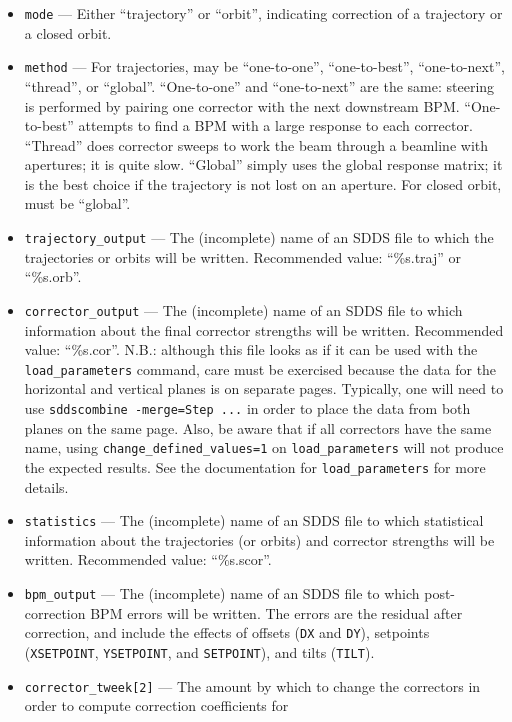 \documentclass[11pt]{article}
\begin{document}
\begin{itemize}

\item \verb|mode| --- Either ``trajectory'' or ``orbit'', indicating
correction of a trajectory or a closed orbit.
\item \verb|method| --- For trajectories, may be ``one-to-one'', ``one-to-best'', ``one-to-next'', ``thread'', or ``global''.  
``One-to-one'' and ``one-to-next'' are the same: steering is performed by pairing one corrector with the next downstream BPM.
``One-to-best'' attempts to find a BPM with a large response to each corrector.  ``Thread'' does corrector sweeps to work the
beam through a beamline with apertures; it is quite slow.  ``Global'' simply uses the global response matrix; it is the best
choice if the trajectory is not lost on an aperture.
For closed orbit, must be ``global''.
\item \verb|trajectory_output| --- The (incomplete) name of an SDDS file to which the trajectories or orbits will be written.  Recommended value: ``\%s.traj'' or ``\%s.orb''.  
\item \verb|corrector_output| --- The (incomplete) name of an SDDS file to which information about the final corrector strengths will be written. Recommended value: ``\%s.cor''.  N.B.: although this file looks as if it can be used with the \verb|load_parameters| command, care must be exercised because the data for the
horizontal and vertical planes is on separate pages. Typically, one will need to use \verb|sddscombine -merge=Step ...| in order to place the data from both planes on the same page. Also, be aware that if all correctors have the same name, using \verb|change_defined_values=1| on \verb|load_parameters| will not produce the expected results. See the documentation for \verb|load_parameters| for more details.
\item \verb|statistics| --- The (incomplete) name of an SDDS file to which statistical information about the
trajectories (or orbits) and corrector strengths will be written.  Recommended value: ``\%s.scor''.
\item \verb|bpm_output| --- The (incomplete) name of an SDDS file to which post-correction BPM errors will be written. The
  errors are the residual after correction, and include the effects of offsets (\verb|DX| and \verb|DY|), setpoints
  (\verb|XSETPOINT|, \verb|YSETPOINT|, and \verb|SETPOINT|), and tilts (\verb|TILT|).
\item \verb|corrector_tweek[2]| --- The amount by which to change the correctors in order to compute correction coefficients for

\end{itemize}
\end{document}
